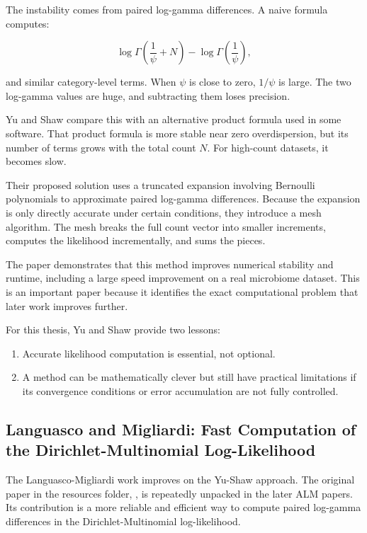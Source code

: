 \documentclass[11pt,a4paper]{article}
\begin{document}
The instability comes from paired log-gamma differences. A naive formula computes:

\[
\log\Gamma\left(\frac{1}{\psi}+N\right)-\log\Gamma\left(\frac{1}{\psi}\right),
\]

and similar category-level terms. When \(\psi\) is close to zero, \(1/\psi\) is large. The two log-gamma values are huge, and subtracting them loses precision.

Yu and Shaw compare this with an alternative product formula used in some software. That product formula is more stable near zero overdispersion, but its number of terms grows with the total count \(N\). For high-count datasets, it becomes slow.

Their proposed solution uses a truncated expansion involving Bernoulli polynomials to approximate paired log-gamma differences. Because the expansion is only directly accurate under certain conditions, they introduce a mesh algorithm. The mesh breaks the full count vector into smaller increments, computes the likelihood incrementally, and sums the pieces.

The paper demonstrates that this method improves numerical stability and runtime, including a large speed improvement on a real microbiome dataset. This is an important paper because it identifies the exact computational problem that later work improves further.

For this thesis, Yu and Shaw provide two lessons:

\begin{enumerate}
  \item Accurate likelihood computation is essential, not optional.
  \item A method can be mathematically clever but still have practical limitations if its convergence conditions or error accumulation are not fully controlled.
\end{enumerate}

\subsection{Languasco and Migliardi: Fast Computation of the Dirichlet-Multinomial Log-Likelihood}

The Languasco-Migliardi work improves on the Yu-Shaw approach. The original paper in the resources folder, , is repeatedly unpacked in the later ALM papers. Its contribution is a more reliable and efficient way to compute paired log-gamma differences in the Dirichlet-Multinomial log-likelihood.
\end{document}
